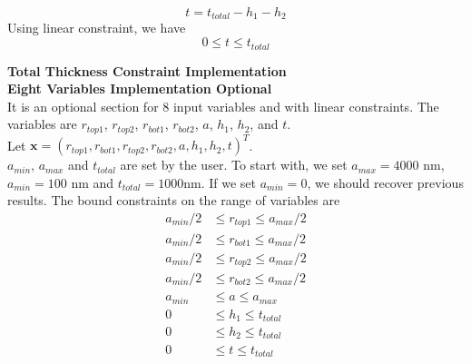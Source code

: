 \documentclass[12pt]{article}
\numberwithin{equation}{section}
\newcommand{\red}[1]{\textcolor{red}{[#1]}} %
\numberwithin{equation}{section}
\begin{document}
\begin{outline}[enumerate]
 \begin{equation}
\boxed{t=t_{total}-h_1-h_2}
 \end{equation}
 Using linear constraint, we have
\begin{equation}
0 \leq t \leq t_{total}
\end{equation}

 
 \1 \textbf{Total Thickness Constraint Implementation} \\
 \textbf{Eight Variables Implementation Optional} \\
It is an optional section for 8 input variables and with linear constraints.  The variables are $r_{top1}$, $r_{top2}$, $r_{bot1}$, $r_{bot2}$, $a$, $h_1$, $h_2$, and  $t$. \\
Let $\mathbf{x} = \left ( r_{top1}, r_{bot1}, r_{top2}, r_{bot2}, a, h_1, h_2, t \right )^T $. \\
$a_{min}$, $a_{max}$ and $t_{total}$ are set by the user.   To start with, we set $a_{max} = 4000$ nm, $a_{min} = 100$ nm and $t_{total} = 1000$nm.  If we set $a_{min} = 0$, we should recover previous results.
The bound constraints on the range of variables are
\begin{align*}
a_{min}/2 & \leq r_{top1} \leq a_{max}/2 \\
a_{min}/2 & \leq r_{bot1} \leq a_{max}/2 \\
a_{min}/2 & \leq r_{top2} \leq a_{max}/2 \\
a_{min}/2 & \leq r_{bot2} \leq a_{max}/2 \\
a_{min} & \leq a \leq a_{max} \\
0 & \leq h_1 \leq t_{total} \\
0 & \leq h_2 \leq t_{total} \\
0 & \leq t \leq t_{total}
\end{align*}


\end{outline}
\end{document}
